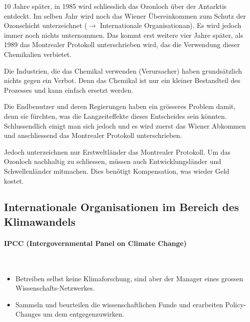 \documentclass[a4paper, 11pt]{article}
\begin{document}
\vspace{10px}

10 Jahre später, in 1985 wird schliesslich das Ozonloch über der Antarktis entdeckt. Im selben Jahr wird noch das Wiener Übereinkommen zum Schutz der Ozonschicht unterzeichnet ($\rightarrow$ Internationale Organisationan). Es wird jedoch immer noch nichts unternommen. Das kommt erst weitere vier Jahre später, als 1989 das Montrealer Protokoll unterschrieben wird, das die Verwendung dieser Chemikalien verbietet.

\vspace{10px}

Die Industrien, die das Chemikal verwenden (Verursacher) haben grundsätzlich nichts gegen ein Verbot. Denn das Chemikal ist nur ein kleiner Bestandteil des Prozesses und kann einfach ersetzt werden. 

Die Endbenutzer und deren Regierungen haben ein grösseres Problem damit, denn sie fürchten, was die Langzeiteffekte dieses Entscheides sein könnten. Schlussendlich einigt man sich jedoch und es wird zuerst das Wiener Abkommen und anschliessend das Montrealer Protokoll unterschrieben. 

Jedoch unterzeichnen nur Erstweltländer das Montrealer Protokoll. Um das Ozonloch nachhaltig zu schliessen, müssen auch Entwicklungsländer und Schwellenländer mitmachen. Dies benötigt Kompensation, was wieder Geld kostet.

\subsection{Internationale Organisationen im Bereich des Klimawandels}

\paragraph{IPCC (Intergovernmental Panel on Climate Change)}\mbox{}\\
\begin{itemize}
    \item Betreiben selbst keine Klimaforschung, sind aber der Manager eines grossen Wissenschafts-Netzwerkes.
    \item Sammeln und beurteilen die wissenschaftlichen Funde und erarbeiten Policy-Changes um dem entgegenzuwirken.
\end{itemize}
\end{document}
